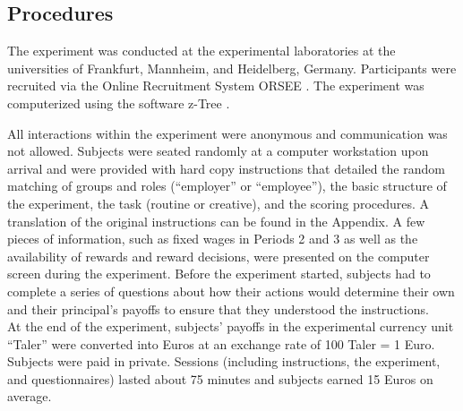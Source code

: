 \subsection{Procedures}
The experiment was conducted at the experimental laboratories at the universities
of Frankfurt, Mannheim, and Heidelberg, Germany.
Participants were recruited via the Online Recruitment System ORSEE
 \citep{Greiner2004}. 
The experiment was computerized using the software z-Tree \citep{fischbacher1999z}. 

All interactions within the experiment were anonymous and communication was not allowed.
Subjects were seated randomly at a computer workstation upon arrival and were 
provided with hard copy instructions that detailed the random matching of groups and roles
 (``employer'' or ``employee''), the basic structure of the experiment, the  task (routine or creative), 
and the scoring procedures. 
A translation of the original instructions can be found in  the Appendix.
A few pieces of information, such as fixed wages in Periods 2 and 3 as well as 
the availability of rewards and reward decisions, were presented on the computer screen 
during the experiment.
Before the experiment started, subjects had to complete  a series of questions about 
how their actions would determine their own and their principal's payoffs 
to ensure that they understood the instructions. \\ %
At the end of the experiment, subjects' payoffs in the experimental
currency unit ``Taler'' were converted into Euros at an exchange rate of 100 Taler = 1 Euro. Subjects were paid in private.
Sessions (including instructions, the experiment, and questionnaires) lasted  about 75 minutes and subjects earned 15 Euros on average. 


